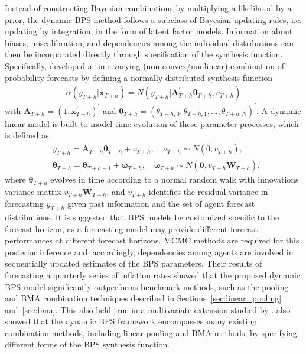 \documentclass[a4paper,11pt]{article}
\begin{document}
Instead of constructing Bayesian combinations by multiplying a likelihood by a prior, the dynamic BPS method follows a subclass of Bayesian updating rules, i.e. updating by integration, in the form of latent factor models. Information about biases, miscalibration, and dependencies among the individual distributions can then be incorporated directly through specification of the synthesis function. Specifically, \citet{McAlinn2019-kn} developed a time-varying (non-convex/nonlinear) combination of probability forecasts by defining a normally distributed synthesis function
\begin{align*}
  \alpha\left(y_{T+h} | \bm{x}_{T+h}\right)=N\left(y_{T+h} | \bm{A}_{T+h}^{\prime} \bm{\theta}_{T+h}, v_{T+h}\right)
\end{align*}
with $\bm{A}_{T+h}=\left(1, \bm{x}_{T+h}^{\prime}\right)^{\prime}$ and $\bm{\theta}_{T+h}=\left(\theta_{T+h, 0}, \theta_{T+h, 1}, \dots, \theta_{T+h, N}\right)^{\prime}$. A dynamic linear model is built to model time evolution of these parameter processes, which is defined as
\begin{align*}
   & y_{T+h}=\bm{A}_{T+h}^{\prime} \bm{\theta}_{T+h}+\nu_{T+h}, \quad \nu_{T+h} \sim N\left(0, v_{T+h}\right),                                                         \\
   & \bm{\theta}_{T+h}=\bm{\theta}_{T+h-1}+\bm{\omega}_{T+h}, \quad \bm{\omega}_{T+h} \sim N\left(\bm{0}, v_{T+h} \bm{W}_{T+h}\right),
\end{align*}
where $\bm{\theta}_{T+h}$ evolves in time according to a normal random walk with innovations variance matrix $v_{T+h} \bm{W}_{T+h}$, and $v_{T+h}$ identifies the residual variance in forecasting $y_{T+h}$ given past information and the set of agent forecast distributions. It is suggested that BPS models be customized specific to the forecast horizon, as a forecasting model may provide different forecast performances at different forecast horizons. MCMC methods are required for this posterior inference and, accordingly, dependencies among agents are involved in sequentially updated estimates of the BPS parameters. Their results of forecasting a quarterly series of inflation rates showed that the proposed dynamic BPS model significantly outperforms benchmark methods, such as the pooling and BMA combination techniques described in Sections~\ref{sec:linear_pooling} and~\ref{sec:bma}. This also held true in a multivariate extension studied by \citet{McAlinn2020-qq}. \citet{McAlinn2019-kn} also showed that the dynamic BPS framework encompasses many existing combination methods, including linear pooling and BMA methods, by specifying different forms of the BPS synthesis function.
\end{document}

